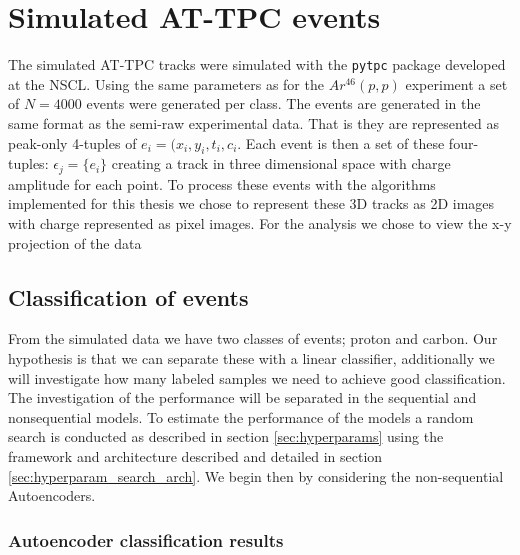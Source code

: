 \section{Simulated AT-TPC events}
The simulated AT-TPC tracks were simulated with the \lstinline{pytpc} package developed at the NSCL. Using the same parameters as for the $Ar^{46}(p, p)$ experiment a set of $N=4000$  events were generated per class. The events are generated in the same format as the semi-raw experimental data. That is they are represented as peak-only 4-tuples of $e_i = (x_i, y_i, t_i, c_i$. Each event is then a set of these four-tuples: $\epsilon_j = \{e_i\}$ creating a track in three dimensional space with charge amplitude for each point. To process these events with the algorithms implemented for this thesis we chose to represent these 3D tracks as 2D images with charge represented as pixel images. For the analysis we chose to view the x-y projection of the data 

\subsection{Classification of events} 
From the simulated data we have two classes of events; proton and carbon. Our hypothesis is that we can separate these with a linear classifier, additionally we will investigate how many labeled samples we need to achieve good classification. The investigation of the performance will be separated in the sequential and non\-sequential models. To estimate the performance of the models a random search is conducted as described in section \ref{sec:hyperparams} using the framework and architecture described and detailed in section \ref{sec:hyperparam_search_arch}. We begin then by considering the non-sequential Autoencoders.

\subsubsection{Autoencoder classification results}

